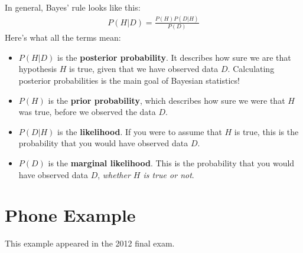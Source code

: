 In general, Bayes' rule looks like this:
\begin{eqnarray}
P(H|D) = \frac{P(H)P(D|H)}{P(D)}
\end{eqnarray}
Here's what all the terms mean:
\begin{itemize}
\item $P(H|D)$ is the {\bf posterior probability}. It describes how sure we are that
hypothesis $H$ is true, given that we have observed data $D$. Calculating
posterior probabilities is the main goal of Bayesian statistics!
\item $P(H)$ is the {\bf prior probability}, which describes how sure we were that
$H$ was true, before we observed the data $D$.
\item $P(D|H)$ is the {\bf likelihood}. If you were to assume that $H$ is true,
this is the probability that you would have observed data $D$.
\item $P(D)$ is the {\bf marginal likelihood}. This is the probability that you
would have observed data $D$, {\it whether $H$ is true or not}.
\end{itemize}










\section{Phone Example}
This example appeared in the 2012 final exam.


